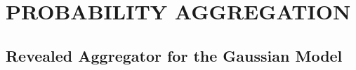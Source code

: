 \documentclass[12pt]{article}
\theoremstyle{definition}
\theoremstyle{definition}
\begin{document}
\section{PROBABILITY AGGREGATION}
\label{aggregation}

\subsection{Revealed Aggregator for the Gaussian Model}
\end{document}
